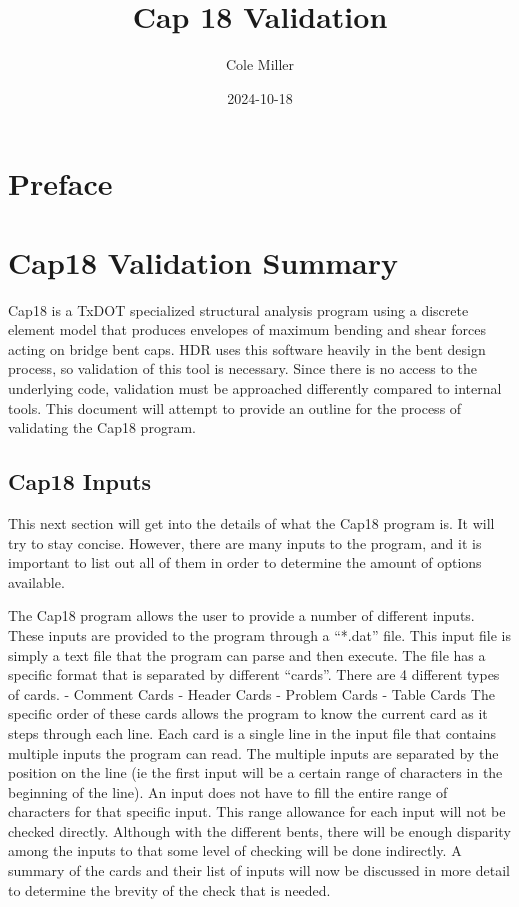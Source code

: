 \documentclass[
  letterpaper,
  DIV=11,
  numbers=noendperiod]{scrreprt}
\title{Cap 18 Validation}
\author{Cole Miller}
\date{2024-10-18}
\renewcommand*\contentsname{Table of contents}
\newcommand\contentsname{Table of contents}
\begin{document}
\maketitle

\renewcommand*\contentsname{Table of contents}
{
\hypersetup{linkcolor=}
\setcounter{tocdepth}{2}
\tableofcontents
}

\chapter{Preface}\label{preface}


\chapter{Cap18 Validation Summary}\label{cap18-validation-summary}

Cap18 is a TxDOT specialized structural analysis program using a
discrete element model that produces envelopes of maximum bending and
shear forces acting on bridge bent caps. HDR uses this software heavily
in the bent design process, so validation of this tool is necessary.
Since there is no access to the underlying code, validation must be
approached differently compared to internal tools. This document will
attempt to provide an outline for the process of validating the Cap18
program.

\section{Cap18 Inputs}\label{cap18-inputs}

This next section will get into the details of what the Cap18 program
is. It will try to stay concise. However, there are many inputs to the
program, and it is important to list out all of them in order to
determine the amount of options available.

The Cap18 program allows the user to provide a number of different
inputs. These inputs are provided to the program through a ``*.dat''
file. This input file is simply a text file that the program can parse
and then execute. The file has a specific format that is separated by
different ``cards''. There are 4 different types of cards. - Comment
Cards - Header Cards - Problem Cards - Table Cards The specific order of
these cards allows the program to know the current card as it steps
through each line. Each card is a single line in the input file that
contains multiple inputs the program can read. The multiple inputs are
separated by the position on the line (ie the first input will be a
certain range of characters in the beginning of the line). An input does
not have to fill the entire range of characters for that specific input.
This range allowance for each input will not be checked directly.
Although with the different bents, there will be enough disparity among
the inputs to that some level of checking will be done indirectly. A
summary of the cards and their list of inputs will now be discussed in
more detail to determine the brevity of the check that is needed.
\end{document}
